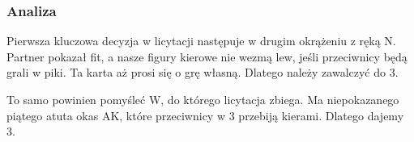\documentclass[12pt, a4paper]{article}
\begin{document}
    \subsubsection*{Analiza}
    Pierwsza kluczowa decyzja w licytacji następuje w 
    drugim okrążeniu z ręką N. Partner pokazał fit, a nasze figury kierowe
    nie wezmą lew, jeśli przeciwnicy będą grali w piki.
    Ta karta aż prosi się o grę własną. Dlatego należy zawalczyć do 3\hearts.

    To samo powinien pomyśleć W, do którego licytacja zbiega.
    Ma niepokazanego piątego atuta okas AK, które przeciwnicy w 3\hearts 
    przebiją kierami. Dlatego dajemy 3\spades.
\end{document}
